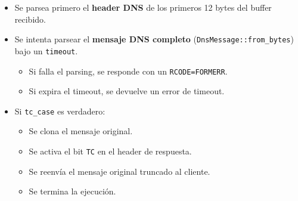 \begin{itemize}
    \item Se parsea primero el \textbf{header DNS} de los primeros 12 bytes del buffer recibido.  
    \item Se intenta parsear el \textbf{mensaje DNS completo} (\texttt{DnsMessage::from\_bytes}) bajo un \texttt{timeout}.
    \begin{itemize}
        \item Si falla el parsing, se responde con un \texttt{RCODE=FORMERR}.
        \item Si expira el timeout, se devuelve un error de timeout.
    \end{itemize}

    \item Si \texttt{tc\_case} es verdadero:
    \begin{itemize}
        \item Se clona el mensaje original.
        \item Se activa el bit \texttt{TC} en el header de respuesta.
        \item Se reenvía el mensaje original truncado al cliente.
        \item Se termina la ejecución.
    \end{itemize}


\end{itemize}
